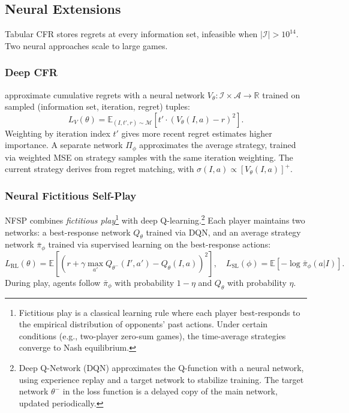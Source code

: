 \subsection{Neural Extensions}

Tabular CFR stores regrets at every information set, infeasible when $|\mathcal{I}| > 10^{14}$. Two neural approaches scale to large games.

\subsubsection{Deep CFR}

\citet{Brown2019} approximate cumulative regrets with a neural network $V_\theta: \mathcal{I} \times \mathcal{A} \to \mathbb{R}$ trained on sampled (information set, iteration, regret) tuples:
\begin{equation}
L_V(\theta) = \mathbb{E}_{(I, t', r) \sim \mathcal{M}} \left[ t' \cdot (V_\theta(I, a) - r)^2 \right].
\end{equation}
Weighting by iteration index $t'$ gives more recent regret estimates higher importance.
A separate network $\Pi_\phi$ approximates the average strategy, trained via weighted MSE on strategy samples with the same iteration weighting. The current strategy derives from regret matching, with $\sigma(I, a) \propto [V_\theta(I, a)]^+$.

\subsubsection{Neural Fictitious Self-Play}

NFSP \citep{heinrich2016deep} combines \emph{fictitious play}\footnote{Fictitious play \citep{Brown1951} is a classical learning rule where each player best-responds to the empirical distribution of opponents' past actions. Under certain conditions (e.g., two-player zero-sum games), the time-average strategies converge to Nash equilibrium.} \citep{Brown1951} with deep Q-learning.\footnote{Deep Q-Network (DQN) \citep{mnih2015} approximates the Q-function with a neural network, using experience replay and a target network to stabilize training. The target network $\theta^-$ in the loss function is a delayed copy of the main network, updated periodically.} Each player maintains two networks: a best-response network $Q_\theta$ trained via DQN, and an average strategy network $\bar{\pi}_\phi$ trained via supervised learning on the best-response actions:
\begin{equation}
L_{\text{RL}}(\theta) = \mathbb{E}\left[ \left( r + \gamma \max_{a'} Q_{\theta^-}(I', a') - Q_\theta(I, a) \right)^2 \right], \quad
L_{\text{SL}}(\phi) = \mathbb{E}\left[ -\log \bar{\pi}_\phi(a | I) \right].
\end{equation}
During play, agents follow $\bar{\pi}_\phi$ with probability $1-\eta$ and $Q_\theta$ with probability $\eta$.

